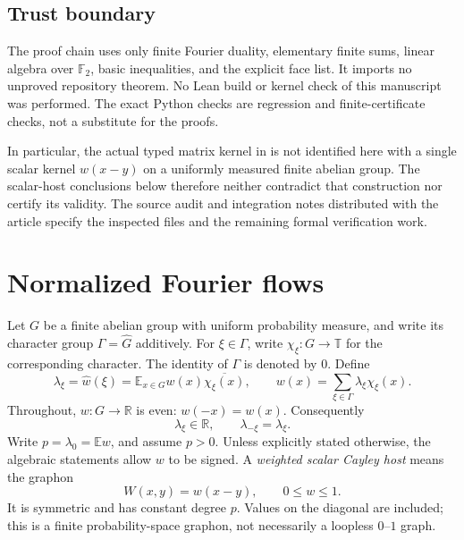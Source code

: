 \documentclass[11pt]{article}
\numberwithin{equation}{section}
\theoremstyle{definition}
\theoremstyle{remark}
\newcommand{\E}{\mathbb E}
\newcommand{\F}{\mathbb F}
\newcommand{\R}{\mathbb R}
\newcommand{\T}{\mathbb T}
\begin{document}
\subsection{Trust boundary}

The proof chain uses only finite Fourier duality, elementary finite sums,
linear algebra over $\F_2$, basic inequalities, and the explicit face list.
It imports no unproved repository theorem. No Lean build or kernel check
of this manuscript was performed. The exact Python checks are regression
and finite-certificate checks, not a substitute for the proofs.

In particular, the actual typed matrix kernel in
\cite{OpenAIKernel} is not identified here with a single scalar kernel
$w(x-y)$ on a uniformly measured finite abelian group. The scalar-host
conclusions below therefore neither contradict that construction nor
certify its validity. The source audit and integration notes distributed
with the article specify the inspected files and the remaining formal
verification work.

\section{Normalized Fourier flows}
\label{sec:flows}

Let $G$ be a finite abelian group with uniform probability measure, and
write its character group $\Gamma=\widehat G$ additively. For
$\xi\in\Gamma$, write $\chi_\xi:G\to\T$ for the corresponding character.
The identity of $\Gamma$ is denoted by $0$. Define
\begin{equation}
 \lambda_\xi=\widehat w(\xi)
   =\E_{x\in G}w(x)\overline{\chi_\xi(x)},
 \qquad
 w(x)=\sum_{\xi\in\Gamma}\lambda_\xi\chi_\xi(x).
 \label{eq:fourier}
\end{equation}
Throughout, $w:G\to\R$ is even: $w(-x)=w(x)$. Consequently
\begin{equation}
 \lambda_\xi\in\R,\qquad
 \lambda_{-\xi}=\lambda_\xi.
 \label{eq:real-even}
\end{equation}
Write $p=\lambda_0=\E w$, and assume $p>0$. Unless explicitly stated
otherwise, the algebraic statements allow $w$ to be signed. A
\emph{weighted scalar Cayley host} means the graphon
\begin{equation}
 W(x,y)=w(x-y),\qquad 0\leq w\leq1.
 \label{eq:host}
\end{equation}
It is symmetric and has constant degree $p$. Values on the diagonal are
included; this is a finite probability-space graphon, not necessarily a
loopless $0$--$1$ graph.
\end{document}
